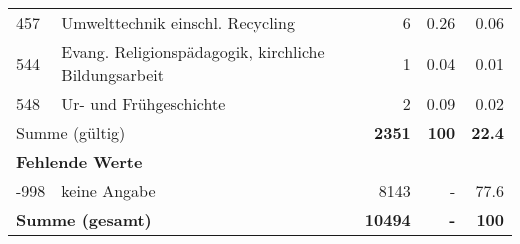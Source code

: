 \begin{longtable}{lXrrr}
        457 & \multicolumn{1}{X}{Umwelttechnik einschl. Recycling} & %
          \num{6} &
          \num[round-mode=places,round-precision=2]{0,26} &
          \num[round-mode=places,round-precision=2]{0,06} \\

        544 & \multicolumn{1}{X}{Evang. Religionspädagogik, kirchliche Bildungsarbeit} & %
          \num{1} &
          \num[round-mode=places,round-precision=2]{0,04} &
          \num[round-mode=places,round-precision=2]{0,01} \\

        548 & \multicolumn{1}{X}{Ur- und Frühgeschichte} & %
          \num{2} &
          \num[round-mode=places,round-precision=2]{0,09} &
          \num[round-mode=places,round-precision=2]{0,02} \\

     \midrule
     \multicolumn{2}{l}{Summe (gültig)} &
       \textbf{\num{2351}} &
     \textbf{100} &
       \textbf{\num[round-mode=places,round-precision=2]{22,4}} \\
     \multicolumn{5}{l}{\textbf{Fehlende Werte}}\\
       -998 &
       keine Angabe &
         \num{8143} &
        - &
         \num[round-mode=places,round-precision=2]{77,6} \\
     \midrule
     \multicolumn{2}{l}{\textbf{Summe (gesamt)}} &
          \textbf{\num{10494}} &
        \textbf{-} &
        \textbf{100} \\
     \bottomrule
     \end{longtable}
     
